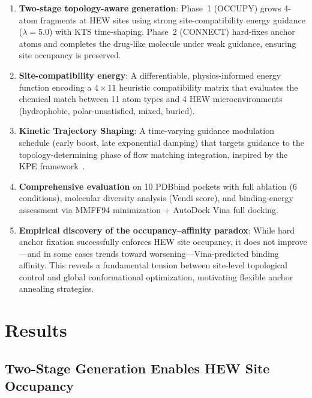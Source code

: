\documentclass[11pt,letterpaper]{article}
\begin{document}
\begin{enumerate}[leftmargin=*]
  \item \textbf{Two-stage topology-aware generation}: Phase~1 (OCCUPY) grows
    4-atom fragments at HEW sites using strong site-compatibility energy
    guidance ($\lambda=5.0$) with KTS time-shaping.  Phase~2 (CONNECT)
    hard-fixes anchor atoms and completes the drug-like molecule under weak
    guidance, ensuring site occupancy is preserved.
  \item \textbf{Site-compatibility energy}: A differentiable, physics-informed
    energy function encoding a $4 \times 11$ heuristic compatibility matrix that
    evaluates the chemical match between 11 atom types and 4 HEW
    microenvironments (hydrophobic, polar-unsatisfied, mixed, buried).
  \item \textbf{Kinetic Trajectory Shaping}: A time-varying guidance modulation
    schedule (early boost, late exponential damping) that targets guidance to
    the topology-determining phase of flow matching integration, inspired by
    the KPE framework~\cite{li2026kpe}.
  \item \textbf{Comprehensive evaluation} on 10 PDBbind pockets with full
    ablation (6 conditions), molecular diversity analysis (Vendi score), and
    binding-energy assessment via MMFF94 minimization + AutoDock Vina full
    docking.
  \item \textbf{Empirical discovery of the occupancy--affinity paradox}: While
    hard anchor fixation successfully enforces HEW site occupancy, it does not
    improve---and in some cases trends toward worsening---Vina-predicted binding
    affinity.  This reveals a fundamental tension between site-level topological
    control and global conformational optimization, motivating flexible anchor
    annealing strategies.
\end{enumerate}

\section{Results}

\subsection{Two-Stage Generation Enables HEW Site Occupancy}
\end{document}

